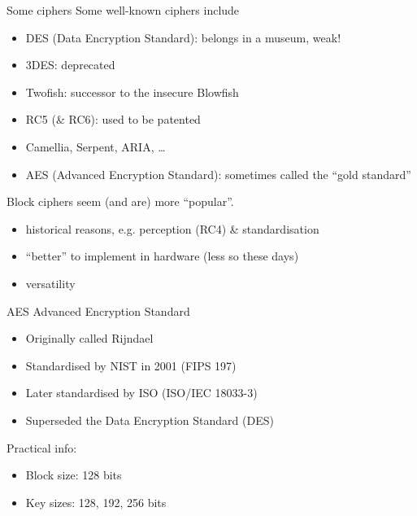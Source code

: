 \begin{frame}{Some ciphers}
  Some well-known ciphers include
  \pause
  \begin{itemize}[<+->]
    \item DES (Data Encryption Standard): belongs in a museum, weak!
    \item 3DES: deprecated
    \item Twofish: successor to the insecure Blowfish
    \item RC5 (\& RC6): used to be patented
    \item Camellia, Serpent, ARIA, \dots
    \item AES (Advanced Encryption Standard): sometimes called the \enquote{gold standard}
  \end{itemize}

  \vspace*{1em}

  \pause
  Block ciphers seem (and are) more \enquote{popular}.
  \begin{itemize}[<+(1)->]
    \item historical reasons, e.g. perception (RC4) \& standardisation
    \item \enquote{better} to implement in hardware (less so these days)
    \item versatility
  \end{itemize}
\end{frame}

\begin{frame}{AES}
  Advanced Encryption Standard
  \begin{itemize}[<+(1)->]
    \item Originally called Rijndael
    \item Standardised by NIST in 2001 (FIPS 197)
    \item Later standardised by ISO (ISO/IEC 18033-3)
    \item Superseded the Data Encryption Standard (DES)
  \end{itemize}

  \pause
  Practical info:
  \begin{itemize}[<+->]
    \item Block size: 128 bits
    \item Key sizes: 128, 192, 256 bits
  \end{itemize}
\end{frame}

